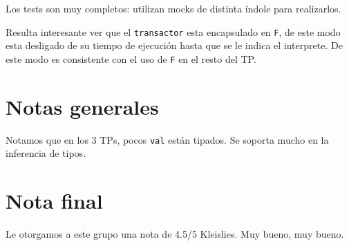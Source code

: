 \documentclass{article}
\begin{document}
Los tests son muy completos: utilizan mocks de distinta índole para realizarlos.

Resulta interesante ver que el \texttt{transactor} esta encapsulado en \texttt{F}, de este modo esta desligado de su tiempo de ejecución hasta que se le indica el interprete. De este modo es consistente con el uso de \texttt{F} en el resto del TP.

\section{Notas generales}
Notamos que en los 3 TPs, pocos \texttt{val} están tipados. Se soporta mucho en la inferencia de tipos.

\section{Nota final}
Le otorgamos a este grupo una nota de 4.5/5 Kleislies. Muy bueno, muy bueno.
\end{document}
